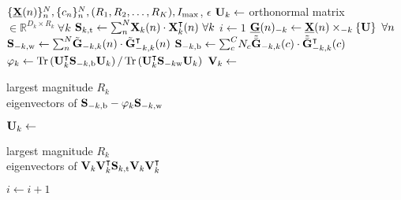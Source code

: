 \begin{algorithmic}[1]
	\Require $\{\ten{X}(n)\}_n^N, \{c_n\}_n^N, (R_1,R_2,\ldots,R_K), I_\text{max}$, $\epsilon$
	\State $\mat{U}_k \gets $ orthonormal matrix $\in \mathbb{R}^{D_k\times R_k}
		\ \forall k$
	\State $\mat{S}_{k,\text{t}} \gets
		\textstyle{\sum_n^N}\mat{X}_k(n)\cdot\mat{X}_k^\intercal(n)\ \forall k$
	\State $i\gets 1$
	\Repeat
	\State $\ten{G}(n)_{-k} \gets \ten{X}(n)\mmprs{\mat{U}}{k} \ \forall n$
	\State $\mat{S}_{-k,\text{w}} \gets
		\textstyle{\sum_n^N}\tilde{\mat{G}}_{-k,k}(n)\cdot\tilde{\mat{G}}_{-k,k}^\intercal(n)$
	\State $\mat{S}_{-k,\text{b}} \gets
		\textstyle{\sum_c^C}N_c\tilde{\bar{\mat{G}}}_{-k,k}(c)\cdot\tilde{\bar{\mat{G}}}_{-k,k}^\intercal(c)$
	\State $\varphi_k\gets\tr\left(\mat{U}_k^\intercal \mat{S}_{-k,\text{b}}\mat{U}_k\right)/\tr\left(\mat{U}_k^\intercal\mat{S}_{-k\text{w}}\mat{U}_k\right)$
	\State $\mat{V}_k\gets$ \parbox[t]{5cm}{largest magnitude $R_k$ \\ eigenvectors of
	$\mat{S}_{-k,\text{b}} - \varphi_k\mat{S}_{-k,\text{w}}$}
	\State $\mat{U}_k \gets$ \parbox[t]{5cm}{largest magnitude $R_k$ \\
	eigenvectors of $\mat{V}_k\mat{V}_k^\intercal\mat{S}_{k,\text{t}}\mat{V}_k\mat{V}_k^\intercal$}
	\EndFor
	\State $i\gets i+1$
\end{algorithmic}
